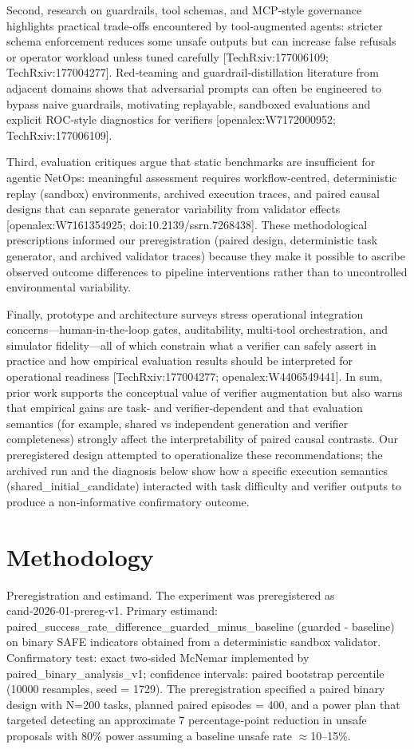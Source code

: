 \documentclass[conference]{IEEEtran}
\begin{document}
Second, research on guardrails, tool schemas, and MCP‑style governance highlights practical trade‑offs encountered by tool‑augmented agents: stricter schema enforcement reduces some unsafe outputs but can increase false refusals or operator workload unless tuned carefully [TechRxiv:177006109; TechRxiv:177004277]. Red‑teaming and guardrail‑distillation literature from adjacent domains shows that adversarial prompts can often be engineered to bypass naive guardrails, motivating replayable, sandboxed evaluations and explicit ROC‑style diagnostics for verifiers [openalex:W7172000952; TechRxiv:177006109].

Third, evaluation critiques argue that static benchmarks are insufficient for agentic NetOps: meaningful assessment requires workflow‑centred, deterministic replay (sandbox) environments, archived execution traces, and paired causal designs that can separate generator variability from validator effects [openalex:W7161354925; doi:10.2139/ssrn.7268438]. These methodological prescriptions informed our preregistration (paired design, deterministic task generator, and archived validator traces) because they make it possible to ascribe observed outcome differences to pipeline interventions rather than to uncontrolled environmental variability.

Finally, prototype and architecture surveys stress operational integration concerns---human‑in‑the‑loop gates, auditability, multi‑tool orchestration, and simulator fidelity---all of which constrain what a verifier can safely assert in practice and how empirical evaluation results should be interpreted for operational readiness [TechRxiv:177004277; openalex:W4406549441]. In sum, prior work supports the conceptual value of verifier augmentation but also warns that empirical gains are task‑ and verifier‑dependent and that evaluation semantics (for example, shared vs independent generation and verifier completeness) strongly affect the interpretability of paired causal contrasts. Our preregistered design attempted to operationalize these recommendations; the archived run and the diagnosis below show how a specific execution semantics (shared\_initial\_candidate) interacted with task difficulty and verifier outputs to produce a non‑informative confirmatory outcome.

\section{Methodology}
Preregistration and estimand. The experiment was preregistered as cand‑2026‑01‑prereg‑v1. Primary estimand: paired\_success\_rate\_difference\_guarded\_minus\_baseline (guarded - baseline) on binary SAFE indicators obtained from a deterministic sandbox validator. Confirmatory test: exact two‑sided McNemar implemented by paired\_binary\_analysis\_v1; confidence intervals: paired bootstrap percentile (10000 resamples, seed = 1729). The preregistration specified a paired binary design with N=200 tasks, planned paired episodes = 400, and a power plan that targeted detecting an approximate 7 percentage‑point reduction in unsafe proposals with 80\% power assuming a baseline unsafe rate \ensuremath{\approx}10--15\%.
\end{document}
